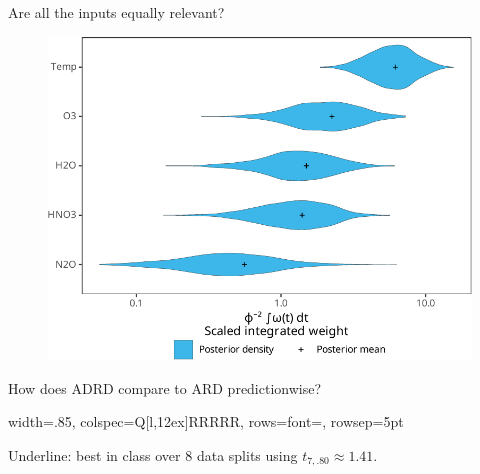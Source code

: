 \documentclass[final]{beamer}
\begin{document}
\begin{frame}[t]
{\begin{minipage}[t][76cm][t]{58cm}
      \begin{minipage}[t]{1.0\linewidth}
        \begin{minipage}[t]{.5\linewidth}
          \begin{block}{Are all the inputs equally relevant?}
            \begin{figure}
              \centering
              \includegraphics[width=.85\linewidth]{inc/mls_weight_integral_fsc070.pdf}
            \end{figure}
          \end{block}
          \begin{block}{How does ADRD compare to ARD predictionwise?}
            \centering
            \begin{tblr}[evaluate=\fileInput]{
                width=.85\textwidth,
                colspec={Q[l,12ex]RRRRR},
                rows={font=\normalsize, rowsep=5pt}}
            \end{tblr}

            Underline: best in class over 8 data splits using
            $t_{7,.80}\approx1.41$.
          \end{block}


\end{minipage}
\end{minipage}
\end{minipage}}
\end{frame}
\end{document}
